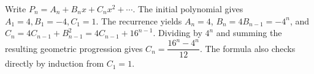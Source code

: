 Write $P_n=A_n+B_nx+C_nx^2+\cdots$. The initial polynomial gives $A_1=4,B_1=-4,C_1=1$. The recurrence yields $A_n=4$, $B_n=4B_{n-1}=-4^n$, and $C_n=4C_{n-1}+B_{n-1}^2=4C_{n-1}+16^{n-1}$. Dividing by $4^n$ and summing the resulting geometric progression gives $\boxed{C_n = \dfrac{16^n-4^n}{12}}$. The formula also checks directly by induction from $C_1=1$.
